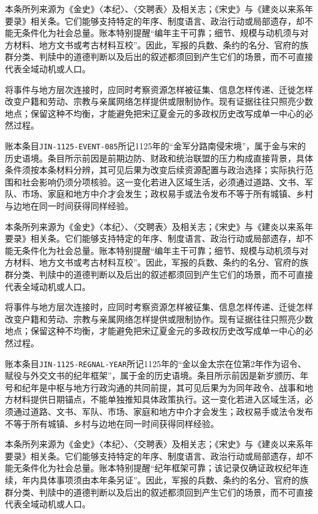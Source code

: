 本条所列来源为《金史》〈本纪〉、〈交聘表〉及相关志；《宋史》与《建炎以来系年要录》相关条。它们能够支持特定的年序、制度语言、政治行动或局部遗存，却不能无条件化为社会总量。账本特别提醒“编年主干可靠；细节、规模与动机须与对方材料、地方文书或考古材料互校”。因此，军报的兵数、条约的名分、官府的族群分类、判牍中的道德判断以及后出的叙述都须回到产生它们的场景，而不可直接代表全域动机或人口。

将事件与地方层次连接时，应同时考察资源怎样被征集、信息怎样传递、迁徙怎样改变户籍和劳动、宗教与亲属网络怎样提供或限制协作。现有证据往往只照亮少数地点；保留这种不均衡，才能避免把宋辽夏金元的多政权历史改写成单一中心的必然过程。

账本条目\texttt{JIN-1125-EVENT-085}所记1125年的“金军分路南侵宋境”，属于金与宋的历史语境。条目所示前因是前期边防、财政和统治联盟的压力构成直接背景，具体条件须按本条材料分辨，其可见后果为改变后续资源配置与政治选择；实际执行范围和社会影响仍须分项核验。这一变化若进入区域生活，必须通过道路、文书、军队、市场、家庭和地方中介才会发生；政权易手或法令发布不等于所有城镇、乡村与边地在同一时间获得同样经验。

本条所列来源为《金史》〈本纪〉、〈交聘表〉及相关志；《宋史》与《建炎以来系年要录》相关条。它们能够支持特定的年序、制度语言、政治行动或局部遗存，却不能无条件化为社会总量。账本特别提醒“编年主干可靠；细节、规模与动机须与对方材料、地方文书或考古材料互校”。因此，军报的兵数、条约的名分、官府的族群分类、判牍中的道德判断以及后出的叙述都须回到产生它们的场景，而不可直接代表全域动机或人口。

将事件与地方层次连接时，应同时考察资源怎样被征集、信息怎样传递、迁徙怎样改变户籍和劳动、宗教与亲属网络怎样提供或限制协作。现有证据往往只照亮少数地点；保留这种不均衡，才能避免把宋辽夏金元的多政权历史改写成单一中心的必然过程。

账本条目\texttt{JIN-1125-REGNAL-YEAR}所记1125年的“金以金太宗在位第2年作为诏令、赋役与外交文书的纪年框架”，属于金的历史语境。条目所示前因是新岁颁历、年号和纪年是中枢与地方行政沟通的共同前提，其可见后果为为同年政令、战事和地方材料提供日期锚点，不能单独推知具体政策执行。这一变化若进入区域生活，必须通过道路、文书、军队、市场、家庭和地方中介才会发生；政权易手或法令发布不等于所有城镇、乡村与边地在同一时间获得同样经验。

本条所列来源为《金史》〈本纪〉、〈交聘表〉及相关志；《宋史》与《建炎以来系年要录》相关条。它们能够支持特定的年序、制度语言、政治行动或局部遗存，却不能无条件化为社会总量。账本特别提醒“纪年框架可靠；该记录仅确证政权纪年连续，年内具体事项须由本年条另证”。因此，军报的兵数、条约的名分、官府的族群分类、判牍中的道德判断以及后出的叙述都须回到产生它们的场景，而不可直接代表全域动机或人口。

